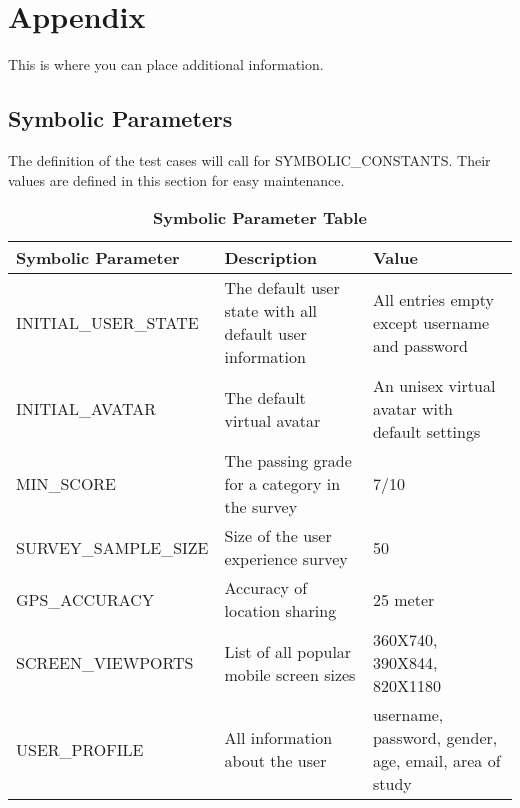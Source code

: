 \documentclass[12pt, titlepage]{article}
\begin{document}
\section{Appendix}

This is where you can place additional information.

\subsection{Symbolic Parameters}

The definition of the test cases will call for SYMBOLIC\_CONSTANTS.
Their values are defined in this section for easy maintenance.

\begin{table}[h]
\caption{\bf Symbolic Parameter Table}
\begin{tabular}{|p{0.4\linewidth} | p{0.3\linewidth}| p{0.3\linewidth} |}
\hline
\multicolumn{1}{|l}{\bfseries Symbolic Parameter} & \multicolumn{1}{|l|}{\bfseries Description} & \multicolumn{1}{l|}{\bfseries Value}\\
\hline
INITIAL\_USER\_STATE & The default user state with all default user information & All entries empty except username and password \\
\hline
INITIAL\_AVATAR & The default virtual avatar & An unisex virtual avatar with default settings \\
\hline
MIN\_SCORE & The passing grade for a category in the survey & 7/10\\
\hline
SURVEY\_SAMPLE\_SIZE & Size of the user experience survey & 50\\
\hline
GPS\_ACCURACY & Accuracy of location sharing & 25 meter\\
\hline
SCREEN\_VIEWPORTS & List of all popular mobile screen sizes & 360X740, 390X844, 820X1180\\
\hline
USER\_PROFILE & All information about the user & username, password, gender, age, email, area of study\\
\hline
\end{tabular}
\end{table}
\end{document}
